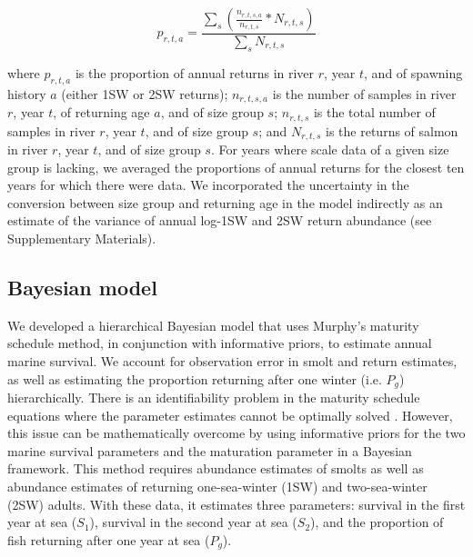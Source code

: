 \documentclass[12pt]{article}
\newcommand{\So}{$S_{1}$\xspace}
\newcommand{\St}{$S_{2}$\xspace}
\newcommand{\Pg}{$P_g$\xspace}
\begin{document}
\begin{equation}
    p_{r,t,a} = \frac{\sum_{s}{(\frac{n_{r,t,s,a}}{n_{r,t,s}} * N_{r,t,s})}}{\sum_{s}{N_{r,t,s}}}
\end{equation}

where $p_{r,t,a}$ is the proportion of annual returns in river $r$, year $t$,
and of spawning history $a$ (either 1SW or 2SW returns); $n_{r,t,s,a}$ is the
number of samples in river $r$, year $t$, of returning age $a$, and of size
group $s$; $n_{r,t,s}$ is the total number of samples in river $r$, year $t$,
and of size group $s$; and $N_{r,t,s}$ is the returns of salmon
in river $r$, year $t$, and of size group $s$.
For years where scale data of a given size group is lacking,
we averaged the proportions of annual returns
for the closest ten years for which there were data.
We incorporated the uncertainty in the conversion between
size group and returning age in the model indirectly as an estimate
of the variance of annual log-1SW and 2SW return abundance (see Supplementary Materials).

\subsection*{Bayesian model}

We developed a hierarchical Bayesian model that uses Murphy's maturity
schedule method, in conjunction with informative priors, to estimate annual
marine survival. We account for
observation error in smolt and return estimates, as well as estimating the
proportion returning after one winter (i.e. \Pg) hierarchically.
There is an identifiability problem in the maturity schedule equations where
the parameter estimates cannot be optimally solved \citep{Chaput2003a}.
However, this issue can be mathematically overcome by
using informative priors for the two marine survival parameters and the maturation
parameter in a Bayesian framework.
This method requires abundance estimates of smolts as well as abundance estimates
of returning one-sea-winter (1SW) and two-sea-winter (2SW) adults. With these data,
it estimates three parameters: survival in the first year at sea (\So), survival
in the second year at sea (\St), and the proportion of fish returning after one
year at sea (\Pg).
\end{document}

